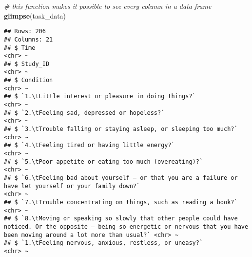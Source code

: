 \documentclass[
]{article}
\newenvironment{Shaded}{\begin{snugshade}}{\end{snugshade}}
\newcommand{\CommentTok}[1]{\textcolor[rgb]{0.56,0.35,0.01}{\textit{#1}}}
\newcommand{\FunctionTok}[1]{\textcolor[rgb]{0.13,0.29,0.53}{\textbf{#1}}}
\newcommand{\NormalTok}[1]{#1}
\begin{document}
\begin{Shaded}
\begin{Highlighting}[]
\CommentTok{\# this function makes it possible to see every column in a data frame}
\FunctionTok{glimpse}\NormalTok{(task\_data)}
\end{Highlighting}
\end{Shaded}

\begin{verbatim}
## Rows: 206
## Columns: 21
## $ Time                                                                                                                                                                             <chr> ~
## $ Study_ID                                                                                                                                                                         <chr> ~
## $ Condition                                                                                                                                                                        <chr> ~
## $ `1.\tLittle interest or pleasure in doing things?`                                                                                                                               <chr> ~
## $ `2.\tFeeling sad, depressed or hopeless?`                                                                                                                                        <chr> ~
## $ `3.\tTrouble falling or staying asleep, or sleeping too much?`                                                                                                                   <chr> ~
## $ `4.\tFeeling tired or having little energy?`                                                                                                                                     <chr> ~
## $ `5.\tPoor appetite or eating too much (overeating)?`                                                                                                                             <chr> ~
## $ `6.\tFeeling bad about yourself – or that you are a failure or have let yourself or your family down?`                                                                           <chr> ~
## $ `7.\tTrouble concentrating on things, such as reading a book?`                                                                                                                   <chr> ~
## $ `8.\tMoving or speaking so slowly that other people could have noticed. Or the opposite — being so energetic or nervous that you have been moving around a lot more than usual?` <chr> ~
## $ `1.\tFeeling nervous, anxious, restless, or uneasy?`                                                                                                                             <chr> ~

\end{verbatim}
\end{document}
